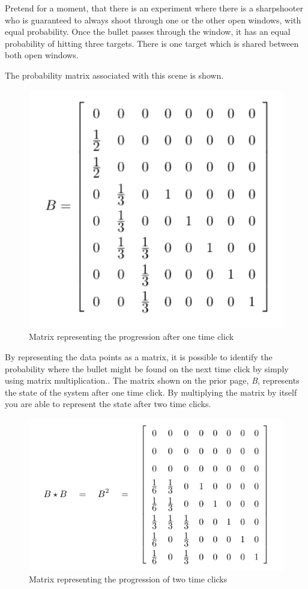 \documentclass[12pt]{article}
\begin{document}
Pretend for a moment, that there is an experiment where there is a sharpshooter who is guaranteed to always shoot through one or the other open windows, with equal probability. Once the bullet passes through the window, it has an equal probability of hitting three targets. There is one target which is shared between both open windows.\par
The probability matrix associated with this scene is shown. 
\begin{figure}[h]
  \centering
  \caption{Matrix representing the progression after one time click}
  \includegraphics{classicB}
\end{figure}
\par
By representing the data points as a matrix, it is possible to identify the probability where the bullet might be found on the next time click by simply using matrix multiplication.\cite{intro}. The matrix shown on the prior page, \textit{B}, represents the state of the system after one time click. By multiplying the matrix by itself you are able to represent the state after two time clicks. 
\begin{figure}[h]
  \centering
  \caption{Matrix representing the progression of two time clicks}
  \includegraphics{classicB2}
\end{figure}\par
\end{document}
